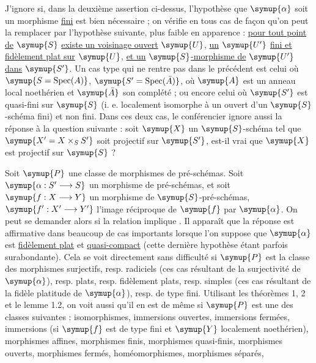  J'ignore si, dans la deuxième assertion ci-dessus,
l'hypothèse que $\symup{\alpha}$ soit un morphisme \uline{fini} est bien nécessaire ; on
vérifie en tous cas de façon  qu'on peut la remplacer par
l'hypothèse suivante, plus faible en apparence : \uline{pour tout point de} $\symup{S}$ \uline{existe un voisinage ouvert} $\symup{U}$, \uline{un} $\symup{U'}$ \uline{fini et fidèlement plat sur} $\symup{U}$, \uline{et un} $\symup{S}$\uline{-morphisme de} $\symup{U'}$ \uline{dans} $\symup{S'}$. Un cas type qui ne rentre pas dans le
précédent est celui où $\symup{S=\operatorname{Spec}(A)}$,
$\symup{S'=\operatorname{Spec}(\bar A)}$, où $\symup{A}$ est un anneau local noethérien et
$\symup{\bar A}$ son complété ; ou encore celui où $\symup{S'}$ est quasi-fini sur $\symup{S}$
(i. e. localement isomorphe à un ouvert d'un $\symup{S}$-schéma fini) et non fini. Dans
ces deux cas, le conférencier ignore aussi la réponse à la question suivante :
soit $\symup{X}$ un $\symup{S}$-schéma tel que $\symup{X'=X\times_SS'}$ soit projectif sur $\symup{S'}$, est-il
vrai que $\symup{X}$ est projectif sur $\symup{S}$ ?

 Soit $\symup{P}$ une classe de morphismes de pré-schémas. Soit
$\symup{\alpha:S'\longrightarrow S}$ un morphisme de pré-schémas, et soit
$\symup{f:X\longrightarrow Y}$ un morphisme de $\symup{S}$-pré-schémas,
$\symup{f':X'\longrightarrow Y'}$ l'image réciproque de $\symup{f}$ par $\symup{\alpha}$. On peut se
demander alors si la relation  implique . Il apparaît
que la réponse est affirmative dans beaucoup de cas importants lorsque l'on
suppose que $\symup{\alpha}$ est \uline{fidèlement plat} et \uline{quasi-compact} (cette
dernière hypothèse étant parfois surabondante). Cela se voit directement sans
difficulté si $\symup{P}$ est la classe des morphismes surjectifs, resp. radiciels (ces
cas résultant de la surjectivité de $\symup{\alpha}$), resp. plats, resp. fidèlement
plats, resp. simples (ces cas résultant de la fidèle platitude de $\symup{\alpha}$),
resp. de type fini. Utilisant les théorèmes 1, 2 et le lemme 1.2, on voit aussi
qu'il en est de même si $\symup{P}$ est une des classes suivantes : isomorphismes,
immersions ouvertes, immersions fermées, immersions (si $\symup{f}$ est de type fini et
$\symup{Y}$ localement noethérien), morphismes affines, morphismes finis, morphismes
quasi-finis, morphismes ouverts, morphismes fermés, homéomorphismes, morphismes
séparés,

